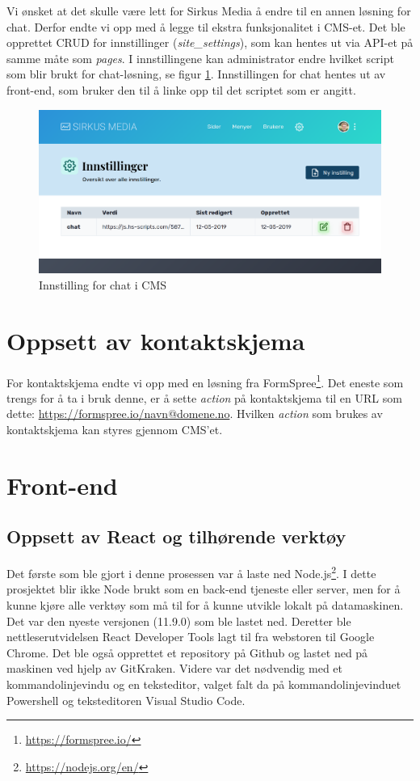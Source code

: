 Vi ønsket at det skulle være lett for Sirkus Media å endre til en annen løsning for chat. Derfor endte vi opp med å legge til ekstra funksjonalitet i CMS-et. Det ble opprettet CRUD for innstillinger (\textit{site\_settings}), som kan hentes ut via API-et på samme måte som \textit{pages}. I innstillingene kan administrator endre hvilket script som blir brukt for chat-løsning, se figur \ref{fig:chat-setting}. Innstillingen for chat hentes ut av front-end, som bruker den til å linke opp til det scriptet som er angitt.
\begin{figure}[H]
    \centering
    \includegraphics[width=\textwidth]{bjornar/chat-setting.png}
    \caption{Innstilling for chat i CMS}
    \label{fig:chat-setting}
\end{figure}

\section{Oppsett av kontaktskjema}
For kontaktskjema endte vi opp med en løsning fra FormSpree\footnote{\url{https://formspree.io/}}. Det eneste som trengs for å ta i bruk denne, er å sette \textit{action} på kontaktskjema til en URL som dette: \url{https://formspree.io/navn@domene.no}. Hvilken \textit{action} som brukes av kontaktskjema kan styres gjennom CMS'et.

\section{Front-end}
\subsection{Oppsett av React og tilhørende verktøy}

Det første som ble gjort i denne prosessen var å laste ned Node.js\footnote{\url{https://nodejs.org/en/}}. I dette prosjektet blir ikke Node brukt som en back-end tjeneste eller server, men for å kunne kjøre alle verktøy som må til for å kunne utvikle lokalt på datamaskinen. Det var den nyeste versjonen (11.9.0) som ble lastet ned. Deretter ble nettleserutvidelsen React Developer Tools lagt til fra  webstoren til Google Chrome. Det ble også opprettet et repository på Github og lastet ned på maskinen ved hjelp av GitKraken. 
Videre var det nødvendig med et kommandolinjevindu og en teksteditor, valget falt da på kommandolinjevinduet Powershell og teksteditoren Visual Studio Code.

